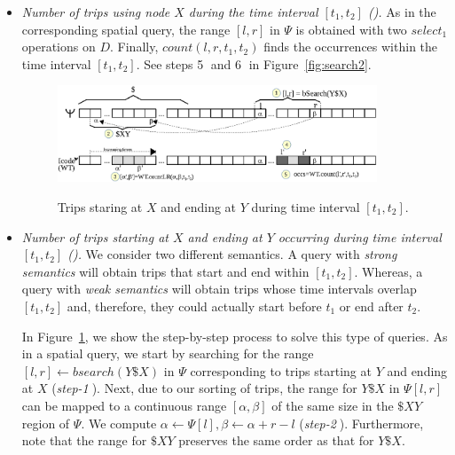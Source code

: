 \begin{itemize}[leftmargin=3mm]
		\item {\em Number of trips using node $X$ during the time interval $[t_1,t_2]$ (\Tux).}
		As in the corresponding spatial query, the range $[l,r]$ in $\Psi$  is obtained with two $select_1$ operations on $D$.
		Finally, $count(l,r,t_1,t_2)$ finds the occurrences within the time interval $[t_1,t_2]$.
		See steps \textcircled{5} and \textcircled{6}  in Figure~\ref{fig:search2}.



	\begin{figure}[thb]
		\begin{center}
			{\includegraphics[width=0.90\textwidth]{figures/search.eps}}
		\end{center}
		\vspace{-0.3cm}
		\caption{Trips staring at $X$ and ending at $Y$ during time interval $[t_1,t_2]$.}
		\label{fig:search}
	\end{figure}	
		\item {\em Number of trips starting at $X$ and ending at $Y$ occurring during  time interval $[t_1,t_2]$ (\Tfxty).}
		We consider two different semantics. A query with  {\em strong semantics} will obtain trips
		that start and end within  $[t_1,t_2]$. Whereas, a query with  {\em weak semantics} will obtain trips
		whose time intervals overlap  $[t_1,t_2]$ and, therefore, they could actually start before $t_1$ or end after $t_2$.
		
		In Figure~\ref{fig:search}, we show the step-by-step process to solve this type of queries.
		As in a spatial query, we start by searching for the range $[l,r] \leftarrow bsearch(Y\$X)$ in $\Psi$ corresponding 
		to trips starting at $Y$ and ending at $X$ ({\em step-\textcircled{1}}). Next, due to our sorting of trips,  the range for $Y\$X$ in $\Psi[l,r]$
		can be mapped to a continuous range $[\alpha,\beta]$ of the same size in the $\$XY$ region of $\Psi$. We compute $\alpha \leftarrow \Psi[l], 
		\beta\leftarrow\alpha+r-l$ ({\em step-\textcircled{2}}). Furthermore, note that the range for $\$XY$ preserves the same order as that for $Y\$X$.
		

\end{itemize}
